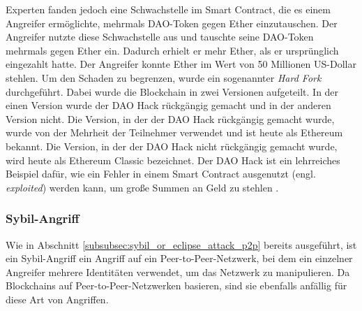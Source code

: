 Experten fanden jedoch eine Schwachstelle im Smart Contract, die es einem Angreifer ermöglichte, mehrmals DAO-Token gegen Ether einzutauschen. Der Angreifer nutzte diese Schwachstelle aus und tauschte seine DAO-Token mehrmals gegen Ether ein. Dadurch erhielt er mehr Ether, als er ursprünglich eingezahlt hatte. Der Angreifer konnte Ether im Wert von 50 Millionen US-Dollar stehlen. Um den Schaden zu begrenzen, wurde ein sogenannter \textit{Hard Fork} durchgeführt. Dabei wurde die Blockchain in zwei Versionen aufgeteilt. In der einen Version wurde der DAO Hack rückgängig gemacht und in der anderen Version nicht. Die Version, in der der DAO Hack rückgängig gemacht wurde, wurde von der Mehrheit der Teilnehmer verwendet und ist heute als Ethereum bekannt. Die Version, in der der DAO Hack nicht rückgängig gemacht wurde, wird heute als Ethereum Classic bezeichnet. Der DAO Hack ist ein lehrreiches Beispiel dafür, wie ein Fehler in einem Smart Contract ausgenutzt (engl. \textit{exploited}) werden kann, um große Summen an Geld zu stehlen \parencite{Price_DAOHack}.


\subsubsection{Sybil-Angriff}

Wie in Abschnitt \ref{subsubsec:sybil_or_eclipse_attack_p2p} \textit{} bereits ausgeführt, ist ein Sybil-Angriff ein Angriff auf ein Peer-to-Peer-Netzwerk, bei dem ein einzelner Angreifer mehrere Identitäten verwendet, um das Netzwerk zu manipulieren. Da Blockchains auf Peer-to-Peer-Netzwerken basieren, sind sie ebenfalls anfällig für diese Art von Angriffen.  



